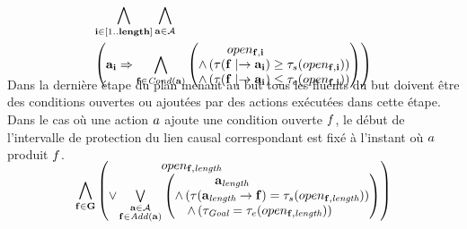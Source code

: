 \begin{small}
\begin{multline*}
~\\[-3em]
\bigwedge\limits_{\substack{\mathbf{i}\in [1..\mathbf{length}]}}\bigwedge\limits_{\substack{\mathbf{\a}\in \mathbf{\A}}}\hfill\\
\left(\mathbf{\a}_{\mathbf{i}} \Rightarrow \bigwedge\limits_{\substack{\mathbf{f}\in \cond{\mathbf{\a}}}}\begin{pmatrix}open_{\mathbf{\f},\mathbf{i}}\hfill\\ \wedge \left(\tau(\mathbf{\f}\mid\rightarrow\mathbf{\a}_\mathbf{i}) \geq \tau_{s}(open_{\mathbf{f},\mathbf{i}})\right)\hfill\\
 \wedge \left(\tau(\mathbf{\f}\mid\rightarrow\mathbf{\a}_\mathbf{i}) \leq \tau_{e}(open_{\mathbf{\f},\mathbf{i}})\right)\end{pmatrix}\right)\hfill\\[-2em]
\end{multline*}
\end{small}

Dans la derni\`{e}re \'{e}tape du plan menant au but tous les fluents du but doivent \^{e}tre des conditions ouvertes ou ajout\'{e}es par des actions ex\'{e}cut\'{e}es dans cette \'{e}tape. Dans le cas o\`{u} une action $a$ ajoute une condition ouverte $f$, le d\'{e}but de l'intervalle de protection du lien causal correspondant est fix\'{e} \`{a} l'instant o\`{u} $a$ produit $f$.

\begin{small}
\begin{multline*}
~\\[-3em]
\bigwedge\limits_{\substack{\mathbf{\f}\in \mathbf{\G}}}\begin{pmatrix}open_{\mathbf{\f},\mathbf{\length}} \hfill\\\vee \bigvee\limits_{\substack{\mathbf{\a}\in \mathbf{\A}\\\mathbf{\f} \in \add{\mathbf{\a}}}}\begin{pmatrix}\mathbf{\a}_{\mathbf{\length}}\hfill\\
 \wedge \left(\tau(\mathbf{\a}_\mathbf{\length}\rightarrow \mathbf{\f}) = \tau_{s}(open_{\mathbf{\f},\mathbf{\length}})\right)\hfill\\
  \wedge \left(\tau_{\textit{Goal}} = \tau_{e}(open_{\mathbf{f},\mathbf{\length}})\right)\hfill\end{pmatrix}\end{pmatrix}\hfill\\[-2em]
%
\end{multline*}
\end{small}


